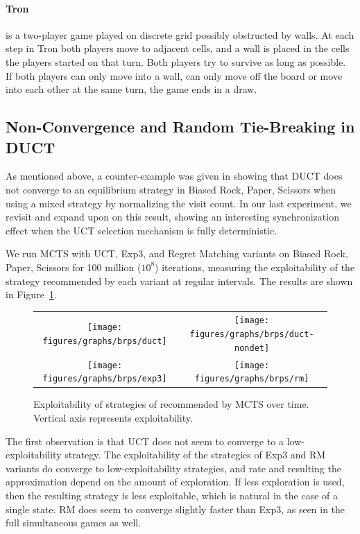 \paragraph{\textbf{Tron}} is a two-player game played on discrete grid possibly obstructed by walls. At each
step in Tron both players move to adjacent cells, and a wall is placed in the cells the players started on that turn.
Both players try to survive as long as possible. If both players can only move into a wall, can only move off the board or move into each other at the same turn, the game ends  in a draw. 

\subsection{Non-Convergence and Random Tie-Breaking in DUCT}\label{sec:exp:brps} 

As mentioned above, a counter-example was given in \cite{Shafiei09} showing that 
DUCT does not converge to an equilibrium strategy in Biased Rock, Paper, Scissors 
when using a mixed strategy by normalizing the visit count.
In our last experiment, we revisit and expand upon on this result, showing an interesting 
synchronization effect when the UCT selection mechanism is fully deterministic.

We run MCTS with UCT, Exp3, and Regret Matching variants on Biased Rock, Paper, Scissors
for 100 million ($10^8$) iterations, measuring the exploitability of the strategy recommended by 
each variant at regular intervals. The results are shown in Figure~\ref{fig:expl-brps}.

\begin{figure}[t]
\begin{tabular}{cc}
\hspace{-1cm} \texttt{[image: figures/graphs/brps/duct]} & \texttt{[image: figures/graphs/brps/duct-nondet]}\\
\hspace{-1cm} \texttt{[image: figures/graphs/brps/exp3]} & \texttt{[image: figures/graphs/brps/rm]}\\
\end{tabular}
\caption{Exploitability of strategies of recommended by MCTS over time. Vertical axis represents exploitability. \label{fig:expl-brps}}
\end{figure}

The first observation is that UCT does not seem to converge to a low-exploitability strategy. The exploitability of the strategies of 
Exp3 and RM variants do converge to low-exploitability strategies, and rate and resulting the approximation depend on the amount of exploration. 
If less exploration is used, then the resulting strategy is less exploitable, which is natural in the case of a single state. RM does seem to 
converge slightly faster than Exp3, as seen in the full simultaneous games as well. 

